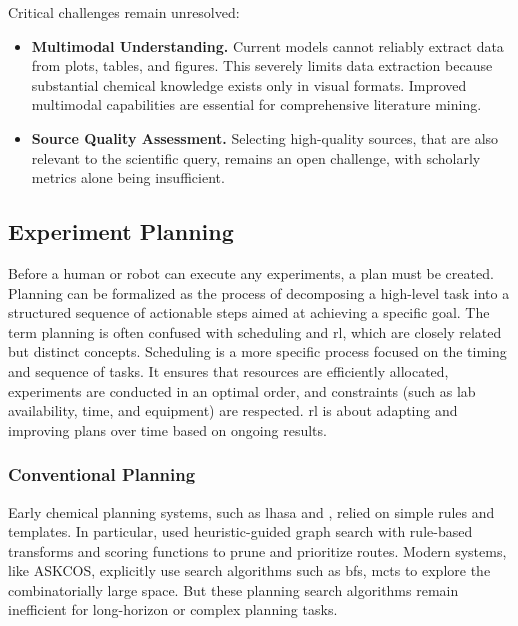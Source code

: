 Critical challenges remain unresolved:

\begin{itemize}
    \item \textbf{Multimodal Understanding.} Current models cannot reliably extract data from plots, tables, and figures.\autocite{alampara2024probing,gupta2022discomat0} This severely limits data extraction because substantial chemical knowledge exists only in visual formats. Improved multimodal capabilities are essential for comprehensive literature mining.
    
    \item \textbf{Source Quality Assessment.} Selecting high-quality sources, that are also relevant to the scientific query, remains an open challenge, with scholarly metrics alone being insufficient.
\end{itemize}




\subsection{Experiment Planning}
\label{sec:planning}
Before a human or robot can execute any experiments, a plan must be created. 
Planning can be formalized as the process of decomposing a high-level task into a structured sequence of actionable steps aimed at achieving a specific goal. 
The term planning is often confused with scheduling and \gls{rl}, which are closely related but distinct concepts. Scheduling is a more specific process focused on the timing and sequence of tasks. 
It ensures that resources are efficiently allocated, experiments are conducted in an optimal order, and constraints (such as lab availability, time, and equipment) are respected.\autocite{kambhampati2023llmplanning} 
\gls{rl} is about adapting and improving plans over time based on ongoing results.\autocite{chen2022deep}



\subsubsection{Conventional Planning} 

Early chemical planning systems, such as \gls{lhasa} \autocite{corey1972computer} and \autocite{grzybowski2018chematica}, relied on simple rules and templates. In particular,  used heuristic-guided graph search with rule-based transforms and scoring functions to prune and prioritize routes. Modern systems, like ASKCOS\autocite{tu2025askcos}, explicitly use search algorithms such as \gls{bfs}, \gls{mcts}\autocite{segler2017towards} to explore the combinatorially large space. But these planning search algorithms remain inefficient for long-horizon or complex planning tasks. \autocite{liu2024entropy, zhao2024efficient}


